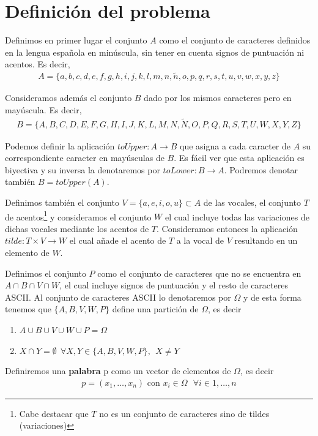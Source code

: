\documentclass[12pt]{article}
\begin{document}
\section{Definición del problema}

Definimos en primer lugar el conjunto $A$ como el conjunto de caracteres definidos en la lengua española en minúscula, sin tener en cuenta signos de puntuación ni acentos. Es decir, 
\begin{gather*}
    A=\{a,b,c,d,e,f,g,h,i,j,k,l,m,n,\tilde{n},o,p,q,r,s,t,u,v,w,x,y,z\}
\end{gather*}

Consideramos además el conjunto $B$ dado por los mismos caracteres pero en mayúscula. Es decir, 
\begin{gather*}
    B=\{A,B,C,D,E,F,G,H,I,J,K,L,M,N,\tilde{N},O,P,Q,R,S,T,U,W,X,Y,Z\}
\end{gather*}

Podemos definir la aplicación $toUpper:A \to B$ que asigna a cada caracter de $A$ su correspondiente caracter en mayúsculas de $B$. Es fácil ver que esta aplicación es biyectiva y su inversa la denotaremos por $toLower: B \to A$. Podremos denotar también $B=toUpper(A)$.

Definimos también el conjunto $V=\{a,e,i,o,u\}\subset A$ de las vocales, el conjunto $T$ de acentos\footnote{Cabe destacar que $T$ no es un conjunto de caracteres sino de tildes (variaciones)} y consideramos el conjunto $W$ el cual incluye todas las variaciones de dichas vocales mediante los acentos de $T$. Consideramos entonces la aplicación $tilde: T \times V \to W$ el cual añade el acento de $T$ a la vocal de $V$ resultando en un elemento de $W$.

Definimos el conjunto $P$ como el conjunto de caracteres que no se encuentra en $A\cap B \cap V \cap W$, el cual incluye signos de puntuación y el resto de caracteres ASCII. Al conjunto de caracteres ASCII lo denotaremos por $\Omega$ y de esta forma tenemos que $\{A,B,V,W,P\}$ define una partición de $\Omega$, es decir
\begin{enumerate}
    \item $A\cup B \cup V \cup W \cup P = \Omega$
    \item $X\cap Y = \emptyset\ \ \forall X,Y\in \{A,B,V,W,P\},\ \  X\neq Y$
\end{enumerate}

Definiremos una \textbf{palabra} p como un vector de elementos de $\Omega$, es decir
\begin{gather*}
    p=(x_1,\dots,x_n) \text{ con } x_i\in \Omega \ \ \ \forall i\in 1,\dots,n
\end{gather*}
\end{document}
